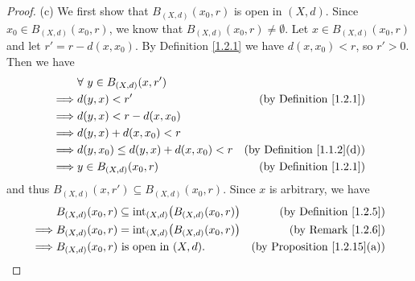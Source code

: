 \begin{proof}{(c)}
    We first show that \(B_{(X, d)}(x_0, r)\) is open in \((X, d)\).
    Since \(x_0 \in B_{(X, d)}(x_0, r)\), we know that \(B_{(X, d)}(x_0, r) \neq \emptyset\).
    Let \(x \in B_{(X, d)}(x_0, r)\) and let \(r' = r - d(x, x_0)\).
    By Definition \ref{1.2.1} we have \(d(x, x_0) < r\), so \(r' > 0\).
    Then we have
    \begin{align*}
                 & \forall\ y \in B_{(X, d)}(x, r')                                               \\
        \implies & d(y, x) < r'                           & \text{(by Definition \ref{1.2.1})}    \\
        \implies & d(y, x) < r - d(x, x_0)                                                        \\
        \implies & d(y, x) + d(x, x_0) < r                                                        \\
        \implies & d(y, x_0) \leq d(y, x) + d(x, x_0) < r & \text{(by Definition \ref{1.1.2}(d))} \\
        \implies & y \in B_{(X, d)}(x_0, r)               & \text{(by Definition \ref{1.2.1})}
    \end{align*}
    and thus \(B_{(X, d)}(x, r') \subseteq B_{(X, d)}(x_0, r)\).
    Since \(x\) is arbitrary, we have
    \begin{align*}
                 & B_{(X, d)}(x_0, r) \subseteq \text{int}_{(X, d)}\big(B_{(X, d)}(x_0, r)\big) & \text{(by Definition \ref{1.2.5})}      \\
        \implies & B_{(X, d)}(x_0, r) = \text{int}_{(X, d)}\big(B_{(X, d)}(x_0, r)\big)         & \text{(by Remark \ref{1.2.6})}          \\
        \implies & B_{(X, d)}(x_0, r) \text{ is open in } (X, d).                               & \text{(by Proposition \ref{1.2.15}(a))}
    \end{align*}


\end{proof}
